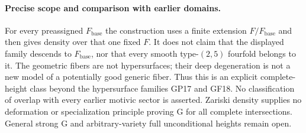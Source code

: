 \paragraph{Precise scope and comparison with earlier domains.}
For every preassigned $F_{\mathrm{base}}$ the construction
uses a finite extension $F/F_{\mathrm{base}}$ and then
gives density over that one fixed $F$.  It does not
claim that the displayed family descends to
$F_{\mathrm{base}}$, nor that every smooth type-$(2,5)$
fourfold belongs to it.  The geometric fibers are
not hypersurfaces; their deep degeneration is not
a new model of a potentially good generic fiber.
Thus this is an explicit complete-height class
beyond the hypersurface families GP17 and GF18.
No classification of overlap with every earlier
motivic sector is asserted.  Zariski density supplies
no deformation or specialization principle proving
G for all complete intersections.  General strong G
and arbitrary-variety full unconditional heights
remain open.
